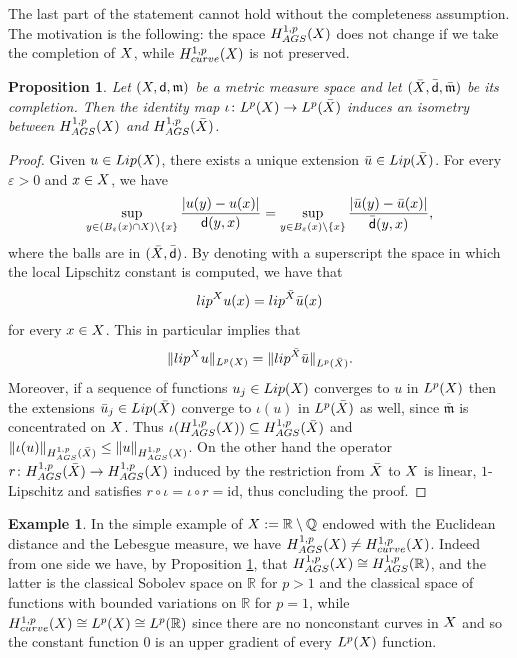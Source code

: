 \documentclass[12pt]{amsart}
\newcommand{\Q}{\mathbb{Q}}
\newcommand{\R}{\mathbb{R}}
\newcommand{\sfd}{{\sf d}}
\newcommand{\X}{{\rm X}}
\newcommand{\lip}{{\rm lip}}
\newcommand{\Lip}{{\rm Lip}}
\newcommand{\mm}{\mathfrak m}
\newtheorem{proposition}[theorem]{Proposition}
\theoremstyle{definition}
\newtheorem{example}[theorem]{Example}
\newcommand{\HH}[2]{H^{1,#1}_{{\rm #2}}}
\begin{document}
The last part of the statement cannot hold without the completeness assumption. The motivation is the following: the space $\HH{p}{AGS}(\X)$ does not change if we take the completion of $\X$, while $\HH{p}{curve}(\X)$ is not preserved.
\begin{proposition}
    \label{prop:AGS_completion}
    Let $(\X,\sfd,\mm)$ be a metric measure space and let $(\bar{\X},\bar{\sfd},\bar{\mm})$ be its completion. Then the identity map $\iota\colon L^p(\X) \to L^p(\bar{\X})$ induces an isometry between $\HH{p}{AGS}(\X)$ and $\HH{p}{AGS}(\bar{\X})$.
\end{proposition}
\begin{proof}
    Given $u \in {\rm Lip}(\X)$, there exists a unique extension $\bar{u} \in {\rm Lip}(\bar{\X})$. For every $\varepsilon >0$ and $x \in \X$, we have
    \begin{equation*}
        \sup_{y \in (B_\varepsilon(x) \cap \X) \setminus \{x\}}\frac{|u(y)-u(x)|}{\sfd(y,x)} =\sup_{y \in B_\varepsilon(x)\setminus \{x\}}\frac{|\bar{u}(y)-\bar{u}(x)|}{\bar{\sfd}(y,x)},
    \end{equation*}
    where the balls are in $(\bar{\X},\bar{\sfd})$. By denoting with a superscript the space in which the local Lipschitz constant is computed, we have that
    \begin{equation*}
        \lip^\X u(x) =\lip^{\bar{\X}}\bar{u}(x)
    \end{equation*}
    for every $x\in \X$. This in particular implies that
    \begin{equation*}
        \|\lip^\X u\|_{L^p(\X)}= \|\lip^{\bar{\X}} \bar{u}\|_{L^p(\bar{\X})}.
    \end{equation*}
    Moreover, if a sequence of functions $u_j \in \Lip(\X)$ converges to $u$ in $L^p(\X)$ then the extensions $\bar{u}_j \in \Lip(\bar{\X})$ converge to $\iota(u)$ in $L^p(\bar{\X})$ as well, since $\bar{\mm}$ is concentrated on $\X$. 
    Thus $\iota(\HH{p}{AGS}(\X)) \subseteq \HH{p}{AGS}(\bar{\X})$ and $\|\iota(u)\|_{\HH{p}{AGS}(\bar{\X})} \le \| u \|_{\HH{p}{AGS}(\X)}$. On the other hand the operator $r \colon \HH{p}{AGS}(\bar{\X}) \to \HH{p}{AGS}(\X)$ induced by the restriction from $\bar{\X}$ to $\X$ is linear, $1$-Lipschitz and satisfies $r \circ \iota = \iota \circ r = \text{id}$, thus concluding the proof.
\end{proof}
\begin{example}
\label{ex:AGS_different_curve}
    In the simple example of $\X := \R \setminus \Q$ endowed with the Euclidean distance and the Lebesgue measure, we have $\HH{p}{AGS}(\X) \neq \HH{p}{curve}(\X)$. Indeed from one side we have, by Proposition \ref{prop:AGS_completion}, that $\HH{p}{AGS}(\X) \cong \HH{p}{AGS}(\R)$, and the latter is the classical Sobolev space on $\R$ for $p>1$ and the classical space of functions with bounded variations on $\R$ for $p=1$, while $\HH{p}{curve}(\X) \cong L^p(\X) \cong L^p(\R)$ since there are no nonconstant curves in $\X$ and so the constant function $0$ is an upper gradient of every $L^p(\X)$ function.
\end{example}
 
\end{document}
